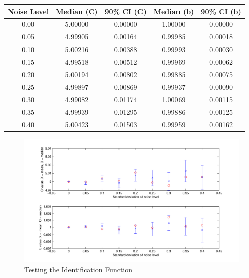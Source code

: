 \begin{table}
  \centering\scriptsize
  \begin{tabular}{c|c|c|c|c}
  Noise Level & Median (C) & 90\% CI (C) & Median (b) & 90\% CI (b) \\
  \hline
  0.00 & 5.00000 & 0.00000 & 1.00000 & 0.00000 \\
  0.05 & 4.99905 & 0.00164 & 0.99985 & 0.00018 \\
  0.10 & 5.00216 & 0.00388 & 0.99993 & 0.00030 \\
  0.15 & 4.99518 & 0.00512 & 0.99969 & 0.00062 \\
  0.20 & 5.00194 & 0.00802 & 0.99885 & 0.00075 \\
  0.25 & 4.99897 & 0.00869 & 0.99937 & 0.00090 \\
  0.30 & 4.99082 & 0.01174 & 1.00069 & 0.00115 \\
  0.35 & 4.99939 & 0.01295 & 0.99886 & 0.00125 \\
  0.40 & 5.00423 & 0.01503 & 0.99959 & 0.00162  
  \end{tabular}
\end{table}
\begin{figure}
  \begin{minipage}{0.5\linewidth}
    \centering
    \includegraphics[width=\textwidth]{images/section-3b}
  \end{minipage}
  \caption{Testing the Identification Function\label{3b-fig}}
\end{figure}
